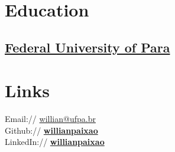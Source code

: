 \documentclass[]{willianpaixao-resume}
\begin{document}
\lastupdated



\begin{minipage}[t]{0.34\textwidth}

\section{Education}

\subsection{\href{https://ufpa.br/}{Federal University of Para}}
\sectionsep


\section{Links}
Email:// \href{mailto:willian@ufpa.br}{willian@ufpa.br}\\
Github:// \href{https://github.com/willianpaixao}{\bf willianpaixao} \\
LinkedIn:// \href{https://www.linkedin.com/in/willianpaixao}{\bf willianpaixao} \\
\sectionsep




\end{minipage}
\end{document}
